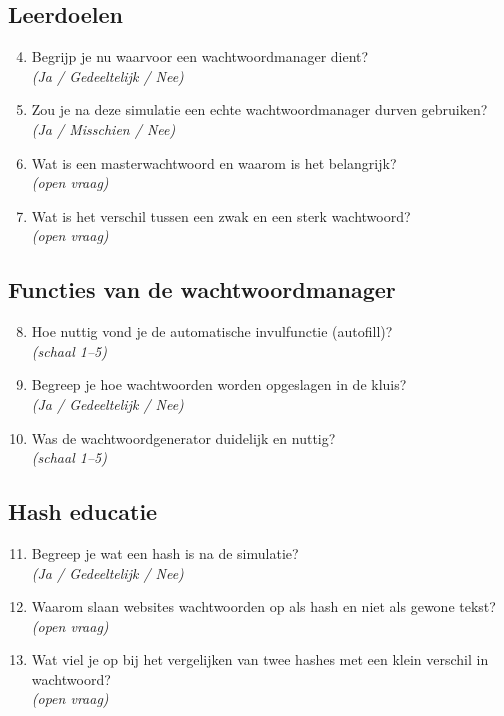 \subsection{Leerdoelen}
\begin{enumerate}
    \setcounter{enumi}{3}
    \item Begrijp je nu waarvoor een wachtwoordmanager dient?\\
    \textit{(Ja / Gedeeltelijk / Nee)}
    
    \item Zou je na deze simulatie een echte wachtwoordmanager durven gebruiken?\\
    \textit{(Ja / Misschien / Nee)}
    
    \item Wat is een masterwachtwoord en waarom is het belangrijk?\\
    \textit{(open vraag)}
    
    \item Wat is het verschil tussen een zwak en een sterk wachtwoord?\\
    \textit{(open vraag)}
\end{enumerate}

\subsection{Functies van de wachtwoordmanager}
\begin{enumerate}
    \setcounter{enumi}{7}
    \item Hoe nuttig vond je de automatische invulfunctie (autofill)?\\
    \textit{(schaal 1--5)}
    
    \item Begreep je hoe wachtwoorden worden opgeslagen in de kluis?\\
    \textit{(Ja / Gedeeltelijk / Nee)}
    
    \item Was de wachtwoordgenerator duidelijk en nuttig?\\
    \textit{(schaal 1--5)}
\end{enumerate}

\subsection{Hash educatie}
\begin{enumerate}
    \setcounter{enumi}{10}
    \item Begreep je wat een hash is na de simulatie?\\
    \textit{(Ja / Gedeeltelijk / Nee)}
    
    \item Waarom slaan websites wachtwoorden op als hash en niet als gewone tekst?\\
    \textit{(open vraag)}
    
    \item Wat viel je op bij het vergelijken van twee hashes met een klein verschil in wachtwoord?\\
    \textit{(open vraag)}
\end{enumerate}

